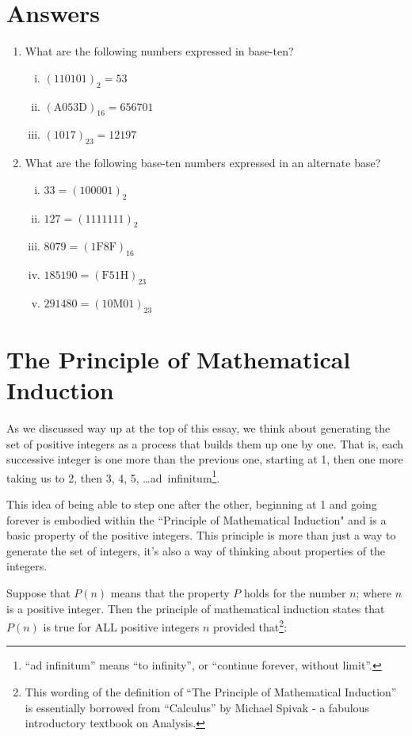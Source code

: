 \documentclass{article}
\begin{document}
\section*{Answers}
\begin{enumerate}
\item What are the following numbers expressed in base-ten?
\begin{enumerate}[i)]
\item $(110101)_2 = 53$
\item $(\text{A}053\text{D})_{16}=656701$
\item $(1017)_{23} = 12197$
\end{enumerate}
\item What are the following base-ten numbers expressed in an alternate base?
\begin{enumerate}[i)]
\item $33 = (100001)_2$
\item $127 = (1111111)_2$
\item $8079 = (1\text{F}8\text{F})_{16}$
\item $185190 = (\text{F}51\text{H})_{23}$
\item $291480 = (10\text{M}01)_{23}$
\end{enumerate}
\end{enumerate}

\break
\section*{The Principle of Mathematical Induction}

As we discussed way up at the top of this essay,
we think about generating the set of positive integers as a process that builds them up one by one.
That is, each successive integer is one more than the previous one,
starting at 1, then one more
taking us to 2,
then 3, 4, 5, \dots{}ad~infinitum\footnote{``ad
infinitum'' means ``to infinity'', or ``continue forever, without limit''.}.

This idea of being able to step one after the other,
beginning at 1 and going forever is embodied within the ``Principle of Mathematical
Induction" and is a basic property of the positive integers.
This principle is more than just a way to generate the set of integers,
it's also a way of thinking about properties of the integers.

Suppose
that $P(n)$ means that the property $P$ holds
for the number $n$; where $n$ is a positive integer.
Then the principle of mathematical induction states that $P(n)$
is true for ALL positive integers $n$ provided that\footnote{This wording of the
definition of ``The Principle of Mathematical Induction'' is essentially borrowed
from ``Calculus'' by Michael Spivak - a fabulous introductory textbook on Analysis.}:
\end{document}
